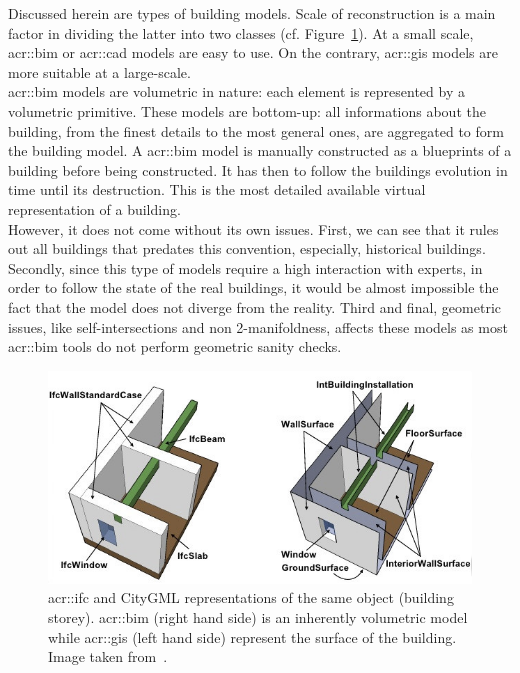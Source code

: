             Discussed herein are types of building models.
            Scale of reconstruction is a main factor in dividing the latter into two classes (cf. Figure~\ref{fig::bim_vs_gis}).
            At a small scale, \gls{acr::bim} or \gls{acr::cad} models are easy to use.
            On the contrary, \gls{acr::gis} models are more suitable at a large-scale.\\

            \gls{acr::bim} models are volumetric in nature:
            each element is represented by a volumetric primitive.
            These models are bottom-up: all informations about the building, from the finest details to the most general ones, are aggregated to form the building model.
            A \gls{acr::bim} model is manually constructed as a blueprints of a building before being constructed.
            It has then to follow the buildings evolution in time until its destruction.
            This is the most detailed available virtual representation of a building.\\
            However, it does not come without its own issues.
            First, we can see that it rules out all buildings that predates this convention, especially, historical buildings.
            Secondly, since this type of models require a high interaction with experts, in order to follow the state of the real buildings, it would be almost impossible the fact that the model does not diverge from the reality\addref.
            Third and final, geometric issues, like self-intersections and non 2-manifoldness, affects these models as most \gls{acr::bim} tools do not perform geometric sanity checks.\\

            \begin{figure}[htpb]
                \centering
                \includegraphics[width=\textwidth]{images/introduction/bim_vs_gis}            
                \caption[
                    \acrshort*{acr::ifc} and CityGML representations of the same object (building storey).
                ]{
                    \label{fig::bim_vs_gis}
                    \gls{acr::ifc} and CityGML representations of the same object (building storey).
                    \gls{acr::bim} (right hand side) is an inherently volumetric model while \gls{acr::gis} (left hand side) represent the surface of the building.
                    Image taken from~\parencite{nagel2009conceptual}.
                }
            \end{figure}

